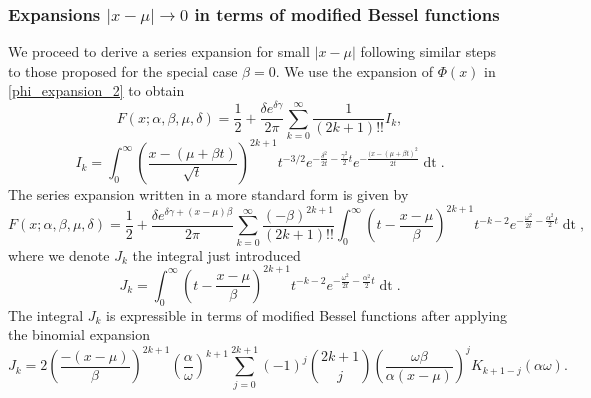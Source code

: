 \documentclass[10pt,a4paper,oneside]{article}
\numberwithin{equation}{section}
\begin{document}
\subsubsection{Expansions $|x-\mu| \to 0$ in terms of modified Bessel functions}
We proceed to derive a series expansion for small $|x-\mu|$ following similar steps to those proposed for the special case $\beta = 0$. We use the expansion of $\Phi(x)$ in  \eqref{phi_expansion_2} to obtain
\begin{equation}\label{general_series_xmu_zero_integral}
F(x;\alpha, \beta, \mu, \delta) = \frac{1}{2} + \frac{\delta e^{\delta \gamma}}{2\pi} \sum_{k=0}^{\infty} \frac{1}{(2k + 1)!!}I_k,
\end{equation}
\begin{equation}\label{general_xmu_zero_integral}
I_k = \int_0^{\infty} \left(\frac{x - (\mu +\beta t)}{\sqrt{t}}\right)^{2k+1} t^{-3/2} e^{-\frac{\delta^2}{2t} - \frac{\gamma^2}{2}t} e^{- \frac{(x-(\mu + \beta t)^2}{2t}} \mathop{dt}.
\end{equation}
The series expansion written in a more standard form is given by
\begin{equation}\label{general_series_xmu_zero_integral_2}
F(x;\alpha, \beta, \mu, \delta) = \frac{1}{2} + \frac{\delta e^{\delta \gamma + (x -\mu)\beta}}{2\pi}\sum_{k=0}^{\infty} \frac{(-\beta)^{2k+1}}{(2k + 1)!!}\int_0^{\infty} \left(t - \frac{x-\mu}{\beta}\right)^{2k+1} t^{-k-2} e^{-\frac{\omega^2}{2t} - \frac{\alpha^2}{2}t} \mathop{dt},
\end{equation}
where we denote $J_k$ the integral just introduced
\begin{equation}
J_k = \int_0^{\infty} \left(t - \frac{x-\mu}{\beta}\right)^{2k+1} t^{-k-2} e^{-\frac{\omega^2}{2t} - \frac{\alpha^2}{2}t} \mathop{dt}.
\end{equation}
The integral $J_k$ is expressible in terms of modified Bessel functions after applying the binomial expansion
\begin{equation}
J_k = 2 \left(\frac{-(x-\mu)}{\beta}\right)^{2k+1} \left(\frac{\alpha}{\omega}\right)^{k+1} \sum_{j=0}^{2k+1} (-1)^j \binom{2k+1}{j} \left(\frac{\omega \beta}{\alpha (x-\mu)}\right)^j K_{k + 1 - j}(\alpha \omega).
\end{equation}
\end{document}
